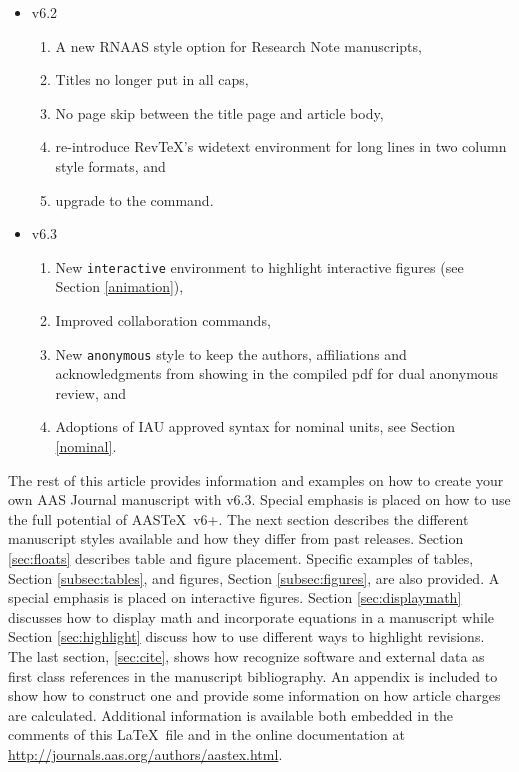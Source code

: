 \documentclass{aastex63}
\newcommand\aastex{AAS\TeX}
\newcommand\latex{La\TeX}
\begin{document}
\begin{itemize}
  \item{v6.2}
    \begin{enumerate}
      \item A new RNAAS style option for Research Note manuscripts,
      \item Titles no longer put in all caps,
      \item No page skip between the title page and article body,
      \item re-introduce RevTeX's widetext environment for long lines in two column style formats, and
      \item upgrade to the {\tt\string\doi} command.
    \end{enumerate}
  \item{v6.3}
    \begin{enumerate}
      \item New {\tt\string interactive} environment to highlight interactive figures (see Section \ref{animation}),
      \item Improved collaboration commands, 
      \item New {\tt\string anonymous} style to keep the authors, affiliations and acknowledgments from showing in the compiled pdf for dual anonymous review, and
      \item Adoptions of IAU approved syntax for nominal units, see Section \ref{nominal}.
    \end{enumerate}
\end{itemize}

The rest of this article provides information and examples on how to create
your own AAS Journal manuscript with v6.3.  Special emphasis is placed on
how to use the full potential of \aastex\ v6+.  The next section describes
the different manuscript styles available and how they differ from past
releases.  Section \ref{sec:floats} describes table and figure placement. 
Specific examples of tables, Section
\ref{subsec:tables}, and figures, Section \ref{subsec:figures}, are also
provided. A special emphasis is placed on interactive figures.
Section \ref{sec:displaymath} discusses how to display math and
incorporate equations in a manuscript while Section \ref{sec:highlight}
discuss how to use different ways to highlight revisions.  The last section,
\ref{sec:cite}, shows how recognize software and external data as first
class references in the manuscript bibliography.  An appendix is included
to show how to construct one and provide some information on how article
charges are calculated.  Additional information is available both embedded
in the comments of this \latex\ file and in the online documentation at
\url{http://journals.aas.org/authors/aastex.html}.
\end{document}
